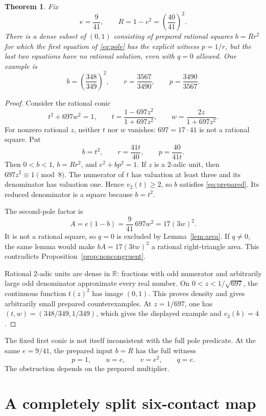 \documentclass[11pt,a4paper]{article}
\newtheorem{theorem}{Theorem}[section]
\theoremstyle{definition}\newtheorem{definition}[theorem]{Definition}
\begin{document}
\begin{theorem}\label{thm:small}
Fix
\[
                 e=\frac9{41},\qquad R=1-e^2=\left(\frac{40}{41}\right)^2.
\]
There is a dense subset of $(0,1)$ consisting of prepared rational squares
$b=Rr^2$ for which the first equation of \eqref{eq:pole} has the explicit
witness $p=1/r$, but the last two equations have no rational solution,
even with $q=0$ allowed. One example is
\[
 b=\left(\frac{348}{349}\right)^2,\qquad
 r=\frac{3567}{3490},\qquad p=\frac{3490}{3567}.
\]
\end{theorem}
\begin{proof}
Consider the rational conic
\begin{equation}\label{eq:smallconic}
 t^2+697w^2=1,\qquad
 t=\frac{1-697z^2}{1+697z^2},\qquad
 w=\frac{2z}{1+697z^2}.
\end{equation}
For nonzero rational $z$, neither $t$ nor $w$ vanishes: $697=17\cdot41$
is not a rational square. Put
\[
                b=t^2,\qquad r=\frac{41t}{40},\qquad p=\frac{40}{41t}.
\]
Then $0<b<1$, $b=Rr^2$, and $e^2+bp^2=1$. If $z$ is a $2$-adic
unit, then $697z^2\equiv1\pmod8$. The numerator of $t$ has valuation
at least three and its denominator has valuation one. Hence
$v_2(t)\ge2$, so $b$ satisfies \eqref{eq:prepared}. Its reduced
denominator is a square because $b=t^2$.

The second-pole factor is
\[
                     A=e(1-b)=\frac9{41}\,697w^2=17(3w)^2.
\]
It is not a rational square, so $q=0$ is excluded by Lemma~\ref{lem:area}.
If $q\ne0$, the same lemma would make $bA=17(3tw)^2$ a rational
right-triangle area. This contradicts Proposition~\ref{prop:noncongruent}.

Rational $2$-adic units are dense in $\mathbb R$: fractions with odd
numerator and arbitrarily large odd denominator approximate every real
number. On $0<z<1/\sqrt{697}$, the continuous function $t(z)^2$
has image $(0,1)$. This proves density and gives arbitrarily small prepared
counterexamples. At $z=1/697$, one has $(t,w)=(348/349,1/349)$,
which gives the displayed example and $v_2(b)=4$.
\end{proof}

The fixed first conic is not itself inconsistent with the full pole
predicate. At the same $e=9/41$, the prepared input $b=R$ has the full
witness
\[
                         p=1,\qquad u=e,\qquad v=e^2,\qquad q=e.
\]
The obstruction depends on the prepared multiplier.

\section{A completely split six-contact map}
\end{document}
